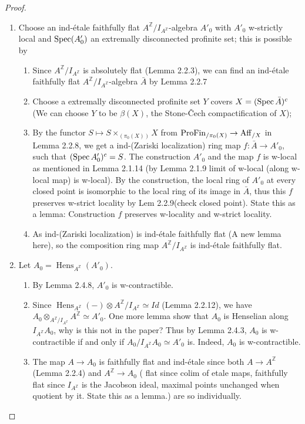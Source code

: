 \begin{proof}
\begin{enumerate}
\item Choose an ind-\'etale faithfully flat $A^{\mathbb{Z}}/I_{A^{\mathbb{Z}}}$-algebra $A'_0$ with $A'_0$ w-strictly local and $\operatorname{Spec}(A'_0)$ an extremally disconnected profinite set; this is possible by
    \begin{enumerate}
    \item Since $A^{\mathbb{Z}}/I_{A^{\mathbb{Z}}}$ is absolutely flat (Lemma 2.2.3), we can find an ind-\'etale faithfully flat $A^{\mathbb{Z}}/I_{A^{\mathbb{Z}}}$-algebra \(\bar{A}\) by Lemma 2.2.7
    \item Choose a extremally disconnected profinite set $Y$ covers \(X = (\operatorname{Spec} \bar{A})^c\) (We can choose \(Y\) to be \(\beta(X)\), the Stone-\v{C}ech compactification of \(X\));
    \item By the functor \(S \mapsto S\times_(\pi_0(X)) X\) from \(\operatorname{ProFin}_{/\pi_0(X)} \to \operatorname{Aff}_{/X}\) in Lemma 2.2.8, we get a ind-(Zariski localization) ring map \(f: \bar{A} \to A'_0 \), such that \((\operatorname{Spec} A'_0)^c = S\). The construction \(A'_0\) and the map \(f\) is w-local as mentioned in Lemma 2.1.14 (by Lemma 2.1.9 limit of w-local (along w-local map) is w-local). By the construction, the local ring of \(A'_0\) at every closed point is isomorphic to the local ring of its image in \(\bar{A}\), thus this \(f\) preserves w-strict locality by Lem 2.2.9(check closed point). {\color{red} State this as a lemma: Construction \(f\) preserves w-locality and w-strict locality.}
    \item As ind-(Zariski localization) is ind-\'etale faithfully flat (A new lemma here), so the composition ring map $A^{\mathbb{Z}}/I_{A^{\mathbb{Z}}}$ is ind-\'etale faithfully flat.
    \end{enumerate}

\item Let $A_0 = \operatorname{Hens}_{A^{\mathbb{Z}}}(A'_0)$. 
    \begin{enumerate}
    \item By Lemma 2.4.8, $A'_0$ is w-contractible.
    \item Since \(\operatorname{Hens}_{A^{\mathbb{Z}}}(-) \otimes A^{\mathbb{Z}}/I_{A^{\mathbb{Z}}} \simeq Id \) (Lemma 2.2.12), we have \(A_0 \otimes_{A^{\mathbb{Z}}/I_{A^{\mathbb{Z}}}} A^{\mathbb{Z}} \simeq A'_0\).
    {\color{red} One more lemma show that \(A_0\) is Henselian along \(I_{A^{\mathbb{Z}}} A_0\), why is this not in the paper?} Thus by Lemma 2.4.3, $A_0$ is w-contractible if and only if $ A_0 / I_{A^{\mathbb{Z}}} A_0 \simeq A'_0 $ is. Indeed, $A_0$ is w-contractible.
    \item The map $A \to A_0$ is faithfully flat and ind-\'etale since both $A \to A^{\mathbb{Z}}$ (Lemma 2.2.4) and $A^{\mathbb{Z}} \to A_0$ ({\color{red} flat since colim of etale maps, faithfully flat since \(I_{A^{\mathbb{Z}}} \) is the Jacobson ideal, maximal points unchanged when quotient by it. State this as a lemma.}) are so individually.
    \end{enumerate}

\end{enumerate}


\end{proof}

